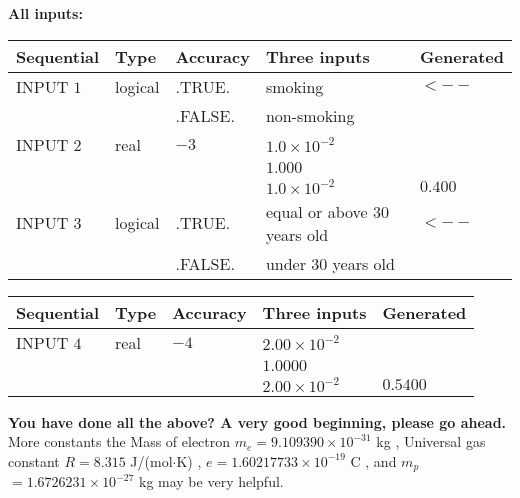 \documentclass[12pt]{article}
\begin{document}
   
   
   
\noindent\vspace{0.1in}\hspace{-0.08in} {\textbf{\Large{All inputs: }}}
   
   
  
  
\noindent\begin{tabular}{|l|l|l|l|l|}
\hline
 Sequential & Type & Accuracy & Three inputs & Generated \\ 
\hline
 
 
  INPUT $            1 $ & logical & .TRUE. & 
 smoking & 
  $ <-- $ 
  \\
  & & .FALSE. & 
  non-smoking & 
 \\  \hline  
 
 
  INPUT $            2 $ & real & $           -3  $ & $
 1.0 \times 10^{-2}
  $ & \\
  & & &  $
 1.000
  $ & \\
  & & &  $
 1.0 \times 10^{-2}
 $ & $ 0.400 $ 
 \\  \hline  
 
 
  INPUT $            3 $ & logical & .TRUE. & 
 equal or above 30 years old & 
  $ <-- $ 
  \\
  & & .FALSE. & 
  under 30 years old & 
 \\  \hline  
 \end{tabular}
   
   
  
  
\noindent\begin{tabular}{|l|l|l|l|l|}
\hline
 Sequential & Type & Accuracy & Three inputs & Generated \\ 
\hline
 
 
  INPUT $            4 $ & real & $           -4  $ & $
 2.00 \times 10^{-2}
  $ & \\
  & & &  $
 1.0000
  $ & \\
  & & &  $
 2.00 \times 10^{-2}
 $ & $ 0.5400 $ 
 \\  \hline  
 \end{tabular}
   
   
   
   
\vspace{0.3in}
{\textbf{\LARGE{You have done all the above? A very good beginning, please go ahead.}}}
More constants the
Mass of electron
$m_e$$ =
9.109390 \times 10^{-31} $
kg
,
Universal gas constant
$R$$ =
8.315 $
J/(mol$\cdot $K)
,
$e$$ =
1.60217733 \times 10^{-19} $
C
, and
$m_p$$ =
1.6726231 \times 10^{-27} $
kg
%
may be very helpful.
\vspace{0.3in}
   
\end{document}
